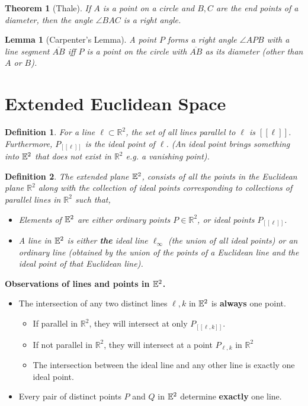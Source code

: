 \documentclass[12pt]{amsart}
\newtheorem*{theorem}{Theorem}
\newtheorem*{lemma}{Lemma}
\newtheorem*{definition}{Definition}
\theoremstyle{remark}
\newtheorem*{basic notion}{Basic Notion}
\newcommand{\RR}{\ensuremath{\mathbb R}}
\newcommand{\EE}{{\ensuremath\mathbb E}}
\newcommand{\ol}[1]{\overline{#1}}
\begin{document}
\begin{theorem}[Thale] If $A$ is a point on a circle and $B,C$ are the end points of a diameter, then the angle $\angle BAC$ is  a right angle.
\end{theorem}
\smallskip

\begin{lemma}[Carpenter's Lemma] A point $P$ forms a right angle $\angle APB$ with a line segment $\ol{AB}$ iff $P$ is a point on the circle with $\ol{AB}$ as its diameter (other than $A$ or $B$).\end{lemma}
\smallskip

\section{Extended Euclidean Space}

\begin{definition} 
For a line $\ell \subset \RR^2$, the set of all lines parallel to $\ell$ is $[\! [\ell]\!]$. Furthermore,  $P_{[\![\ell]\!]}$ is the ideal point of $\ell$. (An ideal point brings something into $\EE^2$ that does not exist in $\RR^2$ e.g. a vanishing point).
\end{definition}
\smallskip

\begin{definition}
The extended plane $\EE^2$, consists of all the points in the Euclidean plane $\RR^2$ along with the collection of ideal points corresponding to collections of parallel lines in $\RR^2$ such that,
\begin{itemize}
\item Elements of $\EE^2$ are either ordinary points $P\in \RR^2$, or ideal points $P_{[\![\ell]\!]}$.
\item A line in $\EE^2$ is either \textbf{the} ideal line $\ell_{\infty}$ (the union of all ideal points) or an ordinary line (obtained by the union of the points of a Euclidean line and the ideal point of that Euclidean line).
\end{itemize}
\end{definition}
\smallskip

\noindent\textbf{Observations of lines and points in $\EE^2$.}

\begin{itemize}
\item The intersection of any two distinct lines $\ell,k$ in $\EE^2$ is \textbf{always} one point. 
\begin{itemize}
\item If parallel in $\RR^2$, they will intersect at only $P_{[\![\ell,k]\!]}$.
\item If not parallel in $\RR^2$, they will intersect at a point $P_{\ell,k}$ in $\RR^2$
\item The intersection between the ideal line and any other line is exactly one ideal point.
\end{itemize}
 \item Every pair of distinct points $P$ and $Q$ in $\EE^2$ determine \textbf{exactly} one line.
 \end{itemize}
\smallskip
\end{document}
